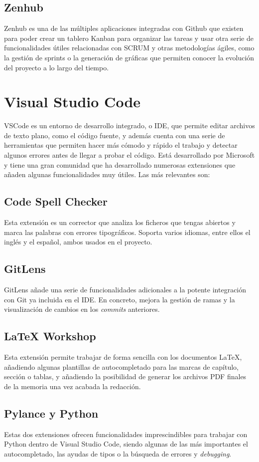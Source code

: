 \subsection{Zenhub}
Zenhub \cite{zenhub} es una de las múltiples aplicaciones integradas con Github que existen para poder crear un tablero Kanban para organizar las tareas y usar otra serie de funcionalidades útiles relacionadas con SCRUM y otras metodologías ágiles, como la gestión de sprints o la generación de gráficas que permiten conocer la evolución del proyecto a lo largo del tiempo.

\section{Visual Studio Code}
VSCode \cite{vscode} es un entorno de desarrollo integrado, o IDE, que permite editar archivos de texto plano, como el código fuente, y además cuenta con una serie de herramientas que permiten hacer más cómodo y rápido el trabajo y detectar algunos errores antes de llegar a probar el código. Está desarrollado por Microsoft y tiene una gran comunidad que ha desarrollado numerosas extensiones que añaden algunas funcionalidades muy útiles. Las más relevantes son:
\subsection{Code Spell Checker}
Esta extensión es un corrector que analiza los ficheros que tengas abiertos y marca las palabras con errores tipográficos. Soporta varios idiomas, entre ellos el inglés y el español, ambos usados en el proyecto.
\subsection{GitLens}
GitLens añade una serie de funcionalidades adicionales a la potente integración con Git ya incluida en el IDE. En concreto, mejora la gestión de ramas y la visualización de cambios en los \textit{commits} anteriores.
\subsection{LaTeX Workshop}
Esta extensión permite trabajar de forma sencilla con los documentos LaTeX, añadiendo algunas plantillas de autocompletado para las marcas de capítulo, sección o tablas, y añadiendo la posibilidad de generar los archivos PDF finales de la memoria una vez acabada la redacción.
\subsection{Pylance y Python}
Estas dos extensiones ofrecen funcionalidades imprescindibles para trabajar con Python dentro de Visual Studio Code, siendo algunas de las más importantes el autocompletado, las ayudas de tipos o la búsqueda de errores y \textit{debugging}.
